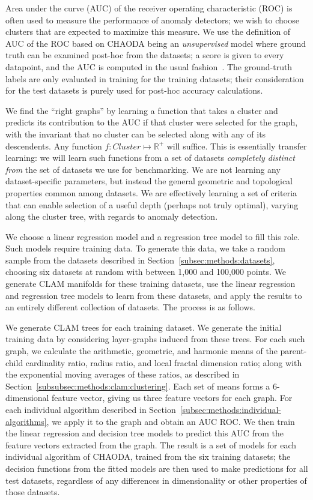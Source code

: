 Area under the curve (AUC) of the receiver operating characteristic (ROC) is often used to measure the performance of anomaly detectors;
we wish to choose clusters that are expected to maximize this measure.
We use the definition of AUC of the ROC based on CHAODA being an \emph{unsupervised} model where ground truth can be examined post-hoc from the datasets; a score is given to every datapoint, and the AUC is computed in the usual fashion~\cite{fawcett2006introduction}.
The ground-truth labels are only evaluated in training for the training datasets; their consideration for the test datasets is purely used for post-hoc accuracy calculations.

We find the ``right graphs'' by learning a function that takes a cluster and predicts its contribution to the AUC if that cluster were selected for the graph, with the invariant that no cluster can be selected along with any of its descendents.
Any function $f: Cluster \mapsto \mathbb{R}^+$ will suffice.
This is essentially transfer learning: we will learn such functions from a set of datasets \emph{completely distinct from} the set of datasets we use for benchmarking.
We are not learning any dataset-specific parameters, but instead the general geometric and topological properties common among datasets.
We are effectively learning a set of criteria that can enable selection of a useful depth (perhaps not truly optimal), varying along the cluster tree, with regards to anomaly detection.

We choose a linear regression model and a regression tree model to fill this role.
Such models require training data.
To generate this data, we take a random sample from the datasets described in Section~\ref{subsec:methods:datasets}, choosing six datasets at random with between 1,000 and 100,000 points.
We generate CLAM manifolds for these training datasets, use the linear regression and regression tree models to learn from these datasets, and apply the results to an entirely different collection of datasets.
The process is as follows.

We generate CLAM trees for each training dataset.
We generate the initial training data by considering layer-graphs induced from these trees.
For each such graph, we calculate the arithmetic, geometric, and harmonic means of the parent-child cardinality ratio, radius ratio, and local fractal dimension ratio;
along with the exponential moving averages of these ratios, as described in Section~\ref{subsubsec:methods:clam:clustering}.
Each set of means forms a 6-dimensional feature vector, giving us three feature vectors for each graph.
For each individual algorithm described in Section~\ref{subsec:methods:individual-algorithms}, we apply it to the graph and obtain an AUC ROC\@.
We then train the linear regression and decision tree models to predict this AUC from the feature vectors extracted from the graph.
The result is a set of models for each individual algorithm of CHAODA, trained from the six training datasets;
the decision functions from the fitted models are then used to make predictions for all test datasets, regardless of any differences in dimensionality or other properties of those datasets.

